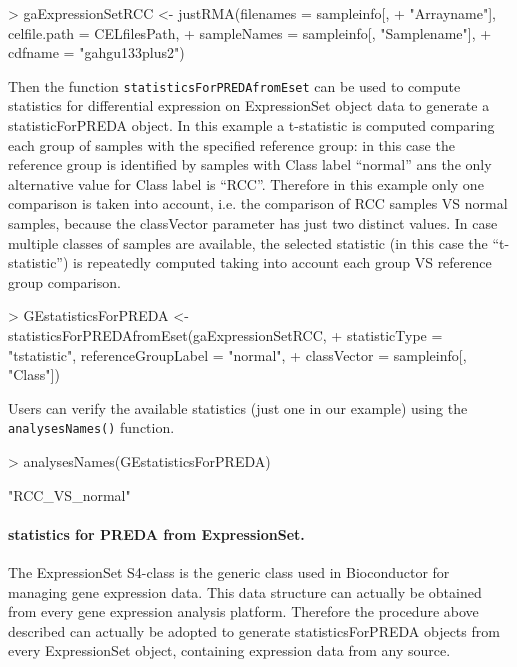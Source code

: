 \documentclass[a4paper,10pt]{article}
\begin{document}
\begin{Schunk}
\begin{Sinput}
> gaExpressionSetRCC <- justRMA(filenames = sampleinfo[, 
+     "Arrayname"], celfile.path = CELfilesPath, 
+     sampleNames = sampleinfo[, "Samplename"], 
+     cdfname = "gahgu133plus2")
\end{Sinput}
\end{Schunk}


Then the function \texttt{statisticsForPREDAfromEset} can be used to compute statistics for differential expression on ExpressionSet object data to generate a statisticForPREDA object. In this example a t-statistic is computed comparing each group of samples with the specified reference group: in this case the reference group is identified by samples with Class label ``normal'' ans the only alternative value for Class label is ``RCC''. Therefore in this example only one comparison is taken into account, i.e. the comparison of RCC samples VS normal samples, because the classVector parameter has just two distinct values. In case multiple classes of samples are available, the selected statistic (in this case the ``t-statistic'') is repeatedly computed taking into account each group VS reference group comparison.

\begin{Schunk}
\begin{Sinput}
> GEstatisticsForPREDA <- statisticsForPREDAfromEset(gaExpressionSetRCC, 
+     statisticType = "tstatistic", referenceGroupLabel = "normal", 
+     classVector = sampleinfo[, "Class"])
\end{Sinput}
\end{Schunk}

Users can verify the available statistics (just one in our example) using the \texttt{analysesNames()} function.
\begin{Schunk}
\begin{Sinput}
> analysesNames(GEstatisticsForPREDA)
\end{Sinput}
\begin{Soutput}
[1] "RCC_VS_normal"
\end{Soutput}
\end{Schunk}


\paragraph{statistics for PREDA from ExpressionSet.} The ExpressionSet S4-class is the generic class used in Bioconductor for managing gene expression data. This data structure can actually be obtained from every gene expression analysis platform. Therefore the procedure above described can actually be adopted to generate statisticsForPREDA objects from every ExpressionSet object, containing expression data from any source.
\end{document}
